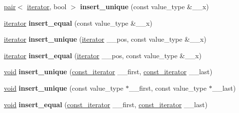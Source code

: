 \begin{DoxyCompactItemize}
\mbox{\label{class___rb__tree_aea3a80c1a3fb327c166f05a00a0b18ec}} 
\hyperlink{structpair}{pair}$<$ \hyperlink{struct___rb__tree__iterator}{iterator}, bool $>$ {\bfseries insert\+\_\+unique} (const value\+\_\+type \&\+\_\+\+\_\+x)
\item 
\mbox{\label{class___rb__tree_aae2985ed9d0315bdccad75347fe73f0a}} 
\hyperlink{struct___rb__tree__iterator}{iterator} {\bfseries insert\+\_\+equal} (const value\+\_\+type \&\+\_\+\+\_\+x)
\item 
\mbox{\label{class___rb__tree_a8c3d8c5ffd203a15952873e3d8e73285}} 
\hyperlink{struct___rb__tree__iterator}{iterator} {\bfseries insert\+\_\+unique} (\hyperlink{struct___rb__tree__iterator}{iterator} \+\_\+\+\_\+pos, const value\+\_\+type \&\+\_\+\+\_\+x)
\item 
\mbox{\label{class___rb__tree_a7f0cd9818ad101f0bba100676e824329}} 
\hyperlink{struct___rb__tree__iterator}{iterator} {\bfseries insert\+\_\+equal} (\hyperlink{struct___rb__tree__iterator}{iterator} \+\_\+\+\_\+pos, const value\+\_\+type \&\+\_\+\+\_\+x)
\item 
\mbox{\label{class___rb__tree_aad72e1ea4939387b8a0a0ce41f64a924}} 
\hyperlink{interfacevoid}{void} {\bfseries insert\+\_\+unique} (\hyperlink{struct___rb__tree__iterator}{const\+\_\+iterator} \+\_\+\+\_\+first, \hyperlink{struct___rb__tree__iterator}{const\+\_\+iterator} \+\_\+\+\_\+last)
\item 
\mbox{\label{class___rb__tree_adc384a6f81880cd81d50cdcca33276ba}} 
\hyperlink{interfacevoid}{void} {\bfseries insert\+\_\+unique} (const value\+\_\+type $\ast$\+\_\+\+\_\+first, const value\+\_\+type $\ast$\+\_\+\+\_\+last)
\item 
\mbox{\label{class___rb__tree_a4bfd057bf66c2221c901218b9a391049}} 
\hyperlink{interfacevoid}{void} {\bfseries insert\+\_\+equal} (\hyperlink{struct___rb__tree__iterator}{const\+\_\+iterator} \+\_\+\+\_\+first, \hyperlink{struct___rb__tree__iterator}{const\+\_\+iterator} \+\_\+\+\_\+last)
\item 
\mbox{\label{class___rb__tree_abe35892b552c7d97c151fc3d1dffd5d9}} 

\end{DoxyCompactItemize}
